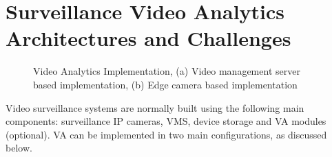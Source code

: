 \section{Surveillance Video Analytics Architectures and Challenges}
\begin{figure}
\centering
{}
\caption{Video Analytics Implementation, (a) Video management server based implementation, (b) Edge camera based implementation}
\label{fig:va_arch}
\end{figure}
Video surveillance systems are normally built using the following main components: surveillance IP cameras, VMS, device storage and VA modules (optional). VA can be implemented in two main configurations, as discussed below.
